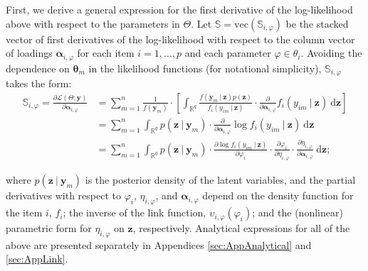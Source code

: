 \documentclass[11pt, a4paper]{article}
\newcommand{\R}{{\ensuremath{\mathbb{R}}}}
\newcommand{\cond}{\!~|~\!}
\begin{document}
First, we derive a general expression for the first derivative of the log-likelihood above with respect to the parameters in $\Theta$. Let $\mathbb{S} = \mathrm{vec}(\mathbb{S}_{i,\varphi})$ be the stacked vector of first derivatives of the log-likelihood with respect to the column vector of loadings $\bm{\alpha}_{i,\varphi}$ for each item $i = 1,...,p$ and each parameter $\varphi \in \theta_i$. Avoiding the dependence on $\bm{\theta}_m$ in the likelihood functions (for notational simplicity), $\mathbb{S}_{i,\varphi}$ takes the form:
\begin{align*}
\mathbb{S}_{i,\varphi} = \frac{\partial \mathcal{L}(\Theta; \mathbf{y})}{\partial \bm{\alpha}_{i,\varphi}} & = \sum\limits_{m=1}^{n} \frac{1}{f(\mathbf{y}_m)} \cdot \left[ \int_{\R^q} \frac{f(\mathbf{y}_m \cond \mathbf{z}) p(\mathbf{z})}{f_i(y_{im} \cond \mathbf{z})} \cdot \frac{\partial}{\partial \bm{\alpha}_{i,\varphi}} f_i(y_{im} \cond \mathbf{z}) ~ \text{d}\mathbf{z} \right] \\[3mm]
& = \sum\limits_{m=1}^{n} \int_{\R^q} p(\mathbf{z} \cond \mathbf{y}_m) \cdot \frac{\partial}{\partial \bm{\alpha}_{i,\varphi}} \log f_i(y_{im} \cond \mathbf{z}) ~ \text{d}\mathbf{z} \label{eq:A1score} \tag{A1} \\[3mm]
& = \sum\limits_{m=1}^{n} \int_{\R^q} p(\mathbf{z} \cond \mathbf{y}_m) \cdot \frac{\partial \log f_i(y_{im} \cond \mathbf{z})}{ \partial \varphi_i} \cdot \frac{\partial \varphi_i}{\partial \eta_{i,\varphi}} \cdot \frac{\partial \eta_{i,\varphi}}{\partial \bm{\alpha}_{i,\varphi}}~ \text{d}\mathbf{z} ; 
\end{align*}

where $p(\mathbf{z} \cond \mathbf{y}_m)$ is the posterior density of the latent variables, and the partial derivatives with respect to $\varphi_i$, $\eta_{i,\varphi}$, and $\bm{\alpha}_{i,\varphi}$ depend on the density function for the item $i$, $f_i$; the inverse of the link function, $\upsilon_{i,\varphi}(\varphi_i)$; and the (nonlinear) parametric form for $\eta_{i,\varphi}$ on $\mathbf{z}$, respectively. Analytical expressions for all of the above are presented separately in Appendices \ref{sec:AppAnalytical} and \ref{sec:AppLink}.
\end{document}
